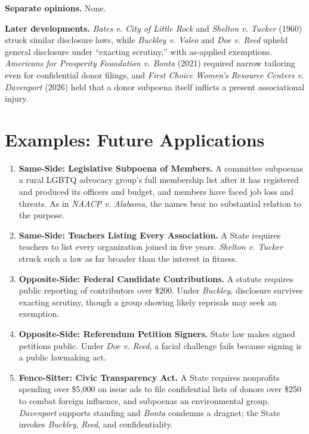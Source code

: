 \documentclass[12pt]{article}
\begin{document}
\textbf{Separate opinions.} None.

\textbf{Later developments.} \textit{Bates v. City of Little Rock} and \textit{Shelton v. Tucker} (1960) struck similar disclosure laws, while \textit{Buckley v. Valeo} and \textit{Doe v. Reed} upheld general disclosure under ``exacting scrutiny,'' with as-applied exemptions. \textit{Americans for Prosperity Foundation v. Bonta} (2021) required narrow tailoring even for confidential donor filings, and \textit{First Choice Women's Resource Centers v. Davenport} (2026) held that a donor subpoena itself inflicts a present associational injury.

\section{Examples: Future Applications}

\begin{enumerate}
\item \textbf{Same-Side: Legislative Subpoena of Members.} A committee subpoenas a rural LGBTQ advocacy group's full membership list after it has registered and produced its officers and budget, and members have faced job loss and threats. As in \textit{NAACP v. Alabama}, the names bear no substantial relation to the purpose.
\item \textbf{Same-Side: Teachers Listing Every Association.} A State requires teachers to list every organization joined in five years. \textit{Shelton v. Tucker} struck such a law as far broader than the interest in fitness.
\item \textbf{Opposite-Side: Federal Candidate Contributions.} A statute requires public reporting of contributors over \$200. Under \textit{Buckley}, disclosure survives exacting scrutiny, though a group showing likely reprisals may seek an exemption.
\item \textbf{Opposite-Side: Referendum Petition Signers.} State law makes signed petitions public. Under \textit{Doe v. Reed}, a facial challenge fails because signing is a public lawmaking act.
\item \textbf{Fence-Sitter: Civic Transparency Act.} A State requires nonprofits spending over \$5,000 on issue ads to file confidential lists of donors over \$250 to combat foreign influence, and subpoenas an environmental group. \textit{Davenport} supports standing and \textit{Bonta} condemns a dragnet; the State invokes \textit{Buckley}, \textit{Reed}, and confidentiality.
\end{enumerate}
\end{document}
